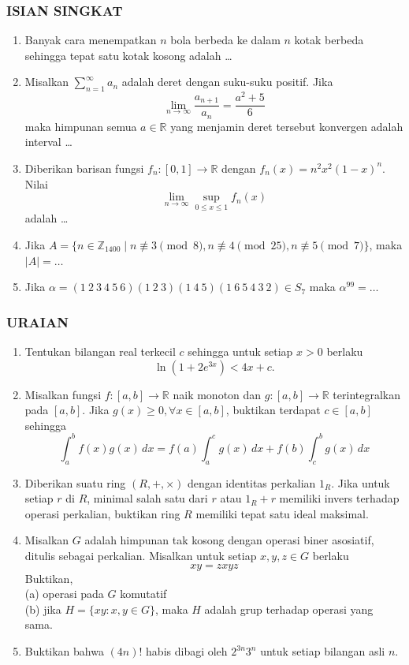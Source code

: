 \documentclass[12pt,twoside]{article}
\begin{document}
\subsubsection*{ISIAN SINGKAT}
\begin{enumerate}
	\item Banyak cara menempatkan $n$ bola berbeda ke dalam $n$ kotak berbeda sehingga tepat satu kotak kosong adalah \dots
	\item Misalkan $\displaystyle\sum_{n=1}^\infty a_n$ adalah deret dengan suku-suku positif. Jika
	      \[
		      \lim_{n\to\infty} \frac{a_{n+1}}{a_n} = \frac{a^2+5}{6}
	      \]
	      maka himpunan semua $a \in \mathbb{R}$ yang menjamin deret tersebut konvergen adalah interval \dots
	\item Diberikan barisan fungsi $f_n : [0,1] \to \mathbb{R}$ dengan $f_n(x) = n^2 x^2 (1-x)^n$. Nilai
	      \[
		      \lim_{n\to\infty} \sup_{0\leq x \leq 1} f_n(x)
	      \]
	      adalah \dots
	\item Jika $A = \{n \in \mathbb{Z}_{1400} \mid n \not\equiv 3 \pmod 8, n \not\equiv 4 \pmod{25}, n \not\equiv 5 \pmod 7\}$, maka $|A| = \dots$
	\item Jika $\alpha = (1\ 2\ 3\ 4\ 5\ 6)(1\ 2\ 3)(1\ 4\ 5)(1\ 6\ 5\ 4\ 3\ 2) \in S_7$ maka $\alpha^{99} = \dots$
\end{enumerate}

\subsubsection*{URAIAN}
\begin{enumerate}
	\item Tentukan bilangan real terkecil $c$ sehingga untuk setiap $x>0$ berlaku
	      \[
		      \ln(1+2e^{3x}) < 4x+c.
	      \]
	\item Misalkan fungsi $f:[a,b] \to \mathbb{R}$ naik monoton dan $g:[a,b] \to \mathbb{R}$ terintegralkan pada $[a,b]$. Jika $g(x) \geq 0, \forall x \in [a,b]$, buktikan terdapat $c \in [a,b]$ sehingga
	      \[
		      \int_a^b f(x)g(x)\, dx = f(a)\int_a^c g(x)\, dx + f(b)\int_c^b g(x)\,dx
	      \]
	\item Diberikan suatu ring $(R, +, \times)$ dengan identitas perkalian $1_R$. Jika untuk setiap $r$ di $R$, minimal salah satu dari $r$ atau $1_R + r$ memiliki invers terhadap operasi perkalian, buktikan ring $R$ memiliki tepat satu ideal maksimal.
	\item Misalkan $G$ adalah himpunan tak kosong dengan operasi biner asosiatif, ditulis sebagai perkalian. Misalkan untuk setiap $x,y,z \in G$ berlaku
	      \[
		      xy = zxyz
	      \]
	      Buktikan,\\
	      (a) operasi pada $G$ komutatif\\
	      (b) jika $H=\{xy:x,y\in G\}$, maka $H$ adalah grup terhadap operasi yang sama.
	\item Buktikan bahwa $(4n)!$ habis dibagi oleh $2^{3n}3^n$ untuk setiap bilangan asli $n$.
\end{enumerate}
\end{document}
